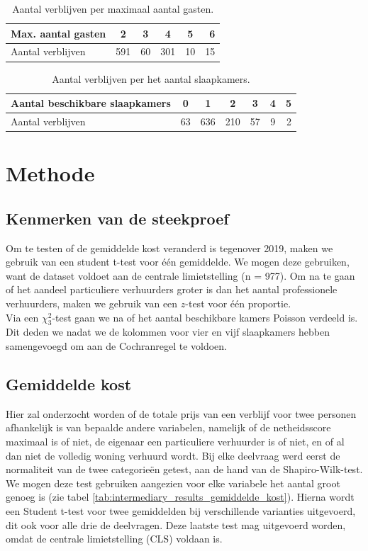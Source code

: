 \documentclass[a4paper]{kulakarticle}
\begin{document}
\begin{table}[h]
	\centering
	\begin{tabular}{|l|c|c|c|c|r|}
		\hline
		Max. aantal gasten&2&3&4&5&6\\[0.5ex]
		\hline
		Aantal verblijven&591&60 &301  &10  &15 \\[0.5ex]
		\hline
	\end{tabular}
	\caption{Aantal verblijven per maximaal aantal gasten.}
	\label{capacity tabel}
\end{table}

\begin{table}[h]
	\centering
	\begin{tabular}{|l|c|c|c|c|c|r|}
		\hline
		Aantal beschikbare slaapkamers&0&1&2&3&4&5\\[0.5ex]
		\hline
		Aantal verblijven&63 &636 &210   &57     &9     &2  \\[0.5ex]
		\hline
	\end{tabular}
	\caption{Aantal verblijven per het aantal slaapkamers.}
	\label{bedrooms tabel}
\end{table}


	
	\section{Methode}
	
	\subsection{Kenmerken van de steekproef}
	Om te testen of de gemiddelde kost veranderd is tegenover 2019, maken we gebruik van een student t-test voor één gemiddelde. We mogen deze gebruiken, want de dataset voldoet aan de centrale limietstelling (n = 977). Om na te gaan of het aandeel particuliere verhuurders groter is dan het aantal professionele verhuurders, maken we gebruik van een $z$-test voor één proportie.\\
	Via een $\chi^2_{3}$-test gaan we na of het aantal beschikbare kamers Poisson verdeeld is. Dit deden we nadat we de kolommen voor vier en vijf slaapkamers hebben samengevoegd om aan de Cochranregel te voldoen.
	
	\subsection{Gemiddelde kost}
	
	Hier zal onderzocht worden of de totale prijs van een verblijf voor twee personen afhankelijk is van bepaalde andere variabelen, namelijk of de netheidsscore maximaal is of niet, de eigenaar een particuliere verhuurder is of niet, en of al dan niet de volledig woning verhuurd wordt.
	Bij elke deelvraag werd eerst de normaliteit van de twee categorieën getest, aan de hand van de Shapiro-Wilk-test. We mogen deze test gebruiken aangezien voor elke variabele het aantal groot genoeg is (zie tabel \ref{tab:intermediary_results_gemiddelde_kost}). Hierna wordt een Student t-test voor twee gemiddelden bij verschillende varianties uitgevoerd, dit ook voor alle drie de deelvragen. Deze laatste test mag uitgevoerd worden, omdat de centrale limietstelling (CLS) voldaan is.
\end{document}
